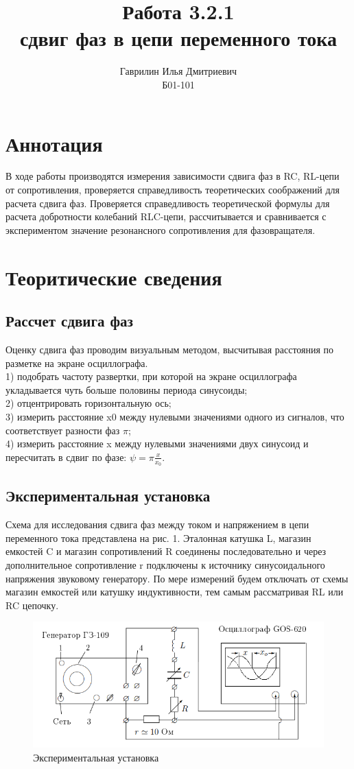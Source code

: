 \documentclass[a4paper, 12pt]{article}%
\author{Гаврилин Илья Дмитриевич \\
	Б01-101}
\title{\textbf{Работа 3.2.1 \\ 
		сдвиг фаз в цепи переменного тока}}
\begin{document}
	\maketitle
	\section{Аннотация}
	В ходе работы производятся измерения зависимости сдвига фаз в RC, RL-цепи от сопротивления, проверяется справедливость теоретических соображений для расчета сдвига фаз. Проверяется справедливость теоретической формулы для расчета добротности колебаний RLC-цепи, рассчитывается и сравнивается с экспериментом значение резонансного сопротивления для фазовращателя.  
	\section{Теоритические сведения}
	\subsection{Рассчет сдвига фаз}
	Оценку сдвига фаз проводим визуальным методом, высчитывая расстояния по разметке на экране осциллографа.\\
	1) подобрать частоту развертки, при которой на экране осциллографа
	укладывается чуть больше половины периода синусоиды;\\
	2) отцентрировать горизонтальную ось;\\
	3) измерить расстояние x0 между нулевыми значениями одного
	из сигналов, что соответствует разности фаз $\pi$;\\
	4) измерить расстояние x между нулевыми значениями двух синусоид и
	пересчитать в сдвиг по фазе: $\psi = \pi \frac{x}{x_0}$.\\
	\subsection{Экспериментальная установка}
	Схема для исследования сдвига фаз между током и напряжением в цепи переменного тока представлена на рис. 1. Эталонная катушка L, магазин емкостей C и магазин сопротивлений R соединены последовательно и через дополнительное сопротивление r подключены к источнику синусоидального напряжения звуковому генератору. По мере измерений будем отключать от схемы магазин емкостей или катушку индуктивности, тем самым рассматривая RL или RC цепочку.
	\begin{figure}[H]
		\centering
		\includegraphics[width=0.7\linewidth]{scheme}
		\caption{Экспериментальная установка}
		\label{fig:scheme}
	\end{figure}
\end{document}
